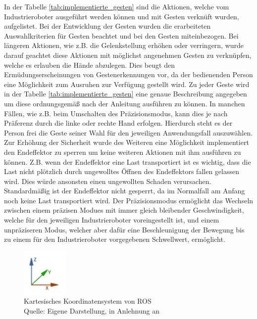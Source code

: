 In der Tabelle \ref{tab:implementierte_gesten} sind die Aktionen, welche vom Industrieroboter ausgeführt werden können und mit Gesten verknüft wurden, aufgelistet. Bei der Entwicklung der Gesten wurden die erarbeiteten Auswahlkriterien für Gesten beachtet und bei den Gesten miteinbezogen. Bei längeren Aktionen, wie z.B. die Gelenkstellung erhöhen oder verringern, wurde darauf geachtet diese Aktionen mit möglichst angenehmen Gesten zu verknüpfen, welche es erlauben die Hände abzulegen. Dies beugt den Ermüdungserscheinungen von Gestenerkennungen vor, da der bedienenden Person eine Möglichkeit zum Ausruhen zur Verfügung gestellt wird. Zu jeder Geste wird in der Tabelle \ref{tab:implementierte_gesten} eine genaue Beschreibung angegeben um diese ordnungsgemäß nach der Anleitung ausführen zu können. In manchen Fällen, wie z.B. beim Umschalten des Präzisionsmodus, kann dies je nach Präferenz durch die linke oder rechte Hand erfolgen. Hierdurch steht es der Person frei die Geste seiner Wahl für den jeweiligen Anwendungsfall auszuwählen. Zur Erhöhung der Sicherheit wurde des Weiteren eine Möglichkeit implementiert den Endeffektor zu sperren um keine weiteren Aktionen mit ihm ausführen zu können. Z.B. wenn der Endeffektor eine Last transportiert ist es wichtig, dass die Last nicht plötzlich durch ungewolltes Öffnen des Endeffektors fallen gelassen wird. Dies würde ansonsten einen ungewollten Schaden verursachen. Standardmäßig ist der Endeffektor nicht gesperrt, da im Normalfall am Anfang noch keine Last transportiert wird. Der Präzisionsmodus ermöglicht das Wechseln zwischen einem präzisen Modues mit immer gleich bleibender Geschwindigkeit, welche für den jeweiligen Industrieroboter voreingestellt ist, und einem unpräziseren Modus, welcher aber dafür eine Beschleunigung der Bewegung bis zu einem für den Industrieroboter vorgegebenen Schwellwert, ermöglicht.

\begin{figure}[htb]
	\centering
	\includegraphics[width=0.2\textwidth]{images/loesungsweg/ros_coordinate_system}
	\caption[Kartesisches Koordinatensystem von ROS]{Kartesisches Koordinatensystem von ROS\\Quelle: Eigene Darstellung, in Anlehnung an \cite{guo_irc-set_2019}}
	\label{fig:ros_coordinate_system}
\end{figure}
\FloatBarrier

